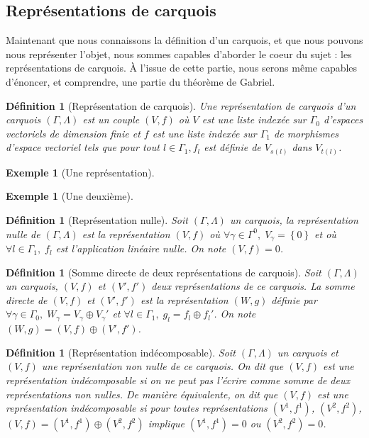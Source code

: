 \documentclass[a4paper,10pt]{article}
\newtheorem{defi}[]{Définition}[section]
\newtheorem{ex}[]{Exemple}[section]
\begin{document}
\subsection{Représentations de carquois}
Maintenant que nous connaissons la définition d'un carquois, et que nous pouvons nous représenter l'objet, nous sommes capables d'aborder le coeur du sujet : les représentations de carquois. À l'issue de cette partie, nous serons même capables d'énoncer, et comprendre, une partie du théorème de Gabriel.
\begin{defi}[Représentation de carquois]
	Une \emph{représentation de carquois} d'un carquois $(\Gamma,\Lambda)$ est un couple $(V,f)$ où $V$ est une liste indexée sur $\Gamma_0$ d'espaces vectoriels de dimension finie et $f$ est une liste indexée sur $\Gamma_1$ de morphismes d'espace vectoriel tels que pour tout $l \in \Gamma_1, f_l$ est définie de $V_{s(l)}$ dans $V_{t(l)}$.
\end{defi}
\begin{ex}[Une représentation]
\end{ex}
\begin{ex}[Une deuxième]
\end{ex}
\begin{defi}[Représentation nulle]
	Soit $(\Gamma,\Lambda)$ un carquois, la \emph{représentation nulle} de $(\Gamma,\Lambda)$ est la représentation $(V,f)$ où $\forall\gamma\in\Gamma^{0},\;V_{\gamma}=\left\{ 0 \right\}$ et où $\forall l \in\Gamma_{1},\;f_{l}$ est l'application linéaire nulle. On note $(V,f)=0$.
\end{defi}
\begin{defi}[Somme directe de deux représentations de carquois]
	Soit $(\Gamma,\Lambda)$ un carquois, $(V,f)$ et $(V',f')$ deux représentations de ce carquois. La \emph{somme directe} de $(V,f)$ et $(V',f')$ est la représentation $(W,g)$ définie par $\forall\gamma\in\Gamma_{0},\;W_{\gamma}=V_{\gamma}\oplus V_{\gamma}'$ et $\forall l \in\Gamma_{1},\;g_{l}=f_{l}\oplus f_{l}'$. On note $(W,g)=(V,f)\oplus (V',f')$.
\end{defi}
\begin{defi}[Représentation indécomposable]
	Soit $(\Gamma,\Lambda)$ un carquois et $(V,f)$ une représentation non nulle de ce carquois. On dit que $(V,f)$ est une \emph{représentation indécomposable} si on ne peut pas l'écrire comme somme de deux représentations non nulles. De manière équivalente, on dit que $(V,f)$ est une représentation indécomposable si pour toutes représentations $(V^{1},f^{1})$, $(V^{2},f^{2})$, $(V,f)=(V^{1},f^{1})\oplus(V^{2},f^{2})$ implique $(V^{1},f^{1})=0$ ou $(V^{2},f^{2})=0$.
\end{defi}
\end{document}
